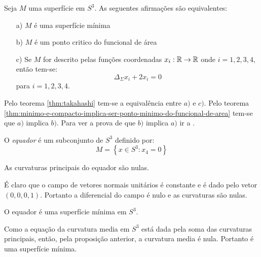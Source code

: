 \begin{teorema}\label{propriedades_sup_min_S3}
	Seja $M$ uma superfície em $S^3$. As seguentes afirmações são equivalentes:
	\begin{enumerate}
		\item[a)] $M$ é uma superfície mínima
		\item[b)] $M$ é um ponto critico do funcional de área
		\item[c)] Se $M$ for descrito pelas funções coordenadas $x_i: \mathbb{R} \rightarrow \mathbb{R}$ onde $i=1,2,3,4$, então tem-se:
		\begin{equation*}
		\Delta_{\Sigma} x_i + 2 x_i = 0
		\end{equation*}
		para $i=1,2,3,4$.
	\end{enumerate}
\end{teorema}

\begin{demonstracao}
	Pelo teorema \ref{thm:takahashi} tem-se a equivalência entre $a)$ e $c)$. Pelo teorema \ref{thm:minimo-e-compacto-implica-ser-ponto-minimo-do-funcional-de-area} tem-se que $a)$ implica $b)$. Para ver a prova de que $b)$ implica $a)$ ir a \cite[\S 2.4]{Simons1968}.
\end{demonstracao}

\begin{definicao}
	O \emph{equador} é um subconjunto de $S^3$ definido por:
	\begin{equation}
	M = \left\{ x \in S^3: x_4 = 0 \right\}
	\end{equation}
\end{definicao}

\begin{proposicao}
	As curvaturas principais do equador são nulas.
\end{proposicao}

\begin{demonstracao}
	É claro que o campo de vetores normais unitários é constante e é dado pelo vetor $(0,0,0,1)$. Portanto a diferencial do campo é nulo e as curvaturas são nulas.
\end{demonstracao}

\begin{corolario}
	O equador é uma superfície mínima em $S^3$.
\end{corolario}

\begin{demonstracao}
	Como a equação da curvatura media em $S^3$ está dada pela soma das curvaturas principais, então, pela proposição anterior, a curvatura media é nula. Portanto é uma superfície mínima.
\end{demonstracao}

